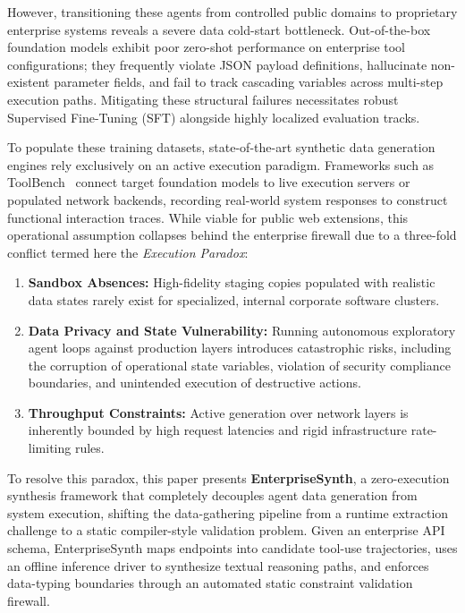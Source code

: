 \documentclass[letterpaper]{article} %
\begin{document}
However, transitioning these agents from controlled public domains to proprietary enterprise
systems reveals a severe data cold-start bottleneck. Out-of-the-box foundation models exhibit poor
zero-shot performance on enterprise tool configurations; they frequently violate JSON payload
definitions, hallucinate non-existent parameter fields, and fail to track cascading variables
across multi-step execution paths. Mitigating these structural failures necessitates robust
Supervised Fine-Tuning (SFT) alongside highly localized evaluation tracks.

To populate these training datasets, state-of-the-art synthetic data generation engines rely
exclusively on an active execution paradigm. Frameworks such as ToolBench~\cite{qin2023toolbench}
connect target foundation models to live execution servers or populated network backends,
recording real-world system responses to construct functional interaction traces. While viable
for public web extensions, this operational assumption collapses behind the enterprise firewall
due to a three-fold conflict termed here the \textit{Execution Paradox}:
\begin{enumerate}
    \item \textbf{Sandbox Absences:} High-fidelity staging copies populated with realistic data
    states rarely exist for specialized, internal corporate software clusters.
    \item \textbf{Data Privacy and State Vulnerability:} Running autonomous exploratory agent loops
    against production layers introduces catastrophic risks, including the corruption of
    operational state variables, violation of security compliance boundaries, and unintended
    execution of destructive actions.
    \item \textbf{Throughput Constraints:} Active generation over network layers is inherently
    bounded by high request latencies and rigid infrastructure rate-limiting rules.
\end{enumerate}

To resolve this paradox, this paper presents \textbf{EnterpriseSynth}, a zero-execution synthesis
framework that completely decouples agent data generation from system execution, shifting the
data-gathering pipeline from a runtime extraction challenge to a static compiler-style validation
problem. Given an enterprise API schema, EnterpriseSynth maps endpoints into candidate tool-use
trajectories, uses an offline inference driver to synthesize textual reasoning paths, and enforces
data-typing boundaries through an automated static constraint validation firewall.
\end{document}
